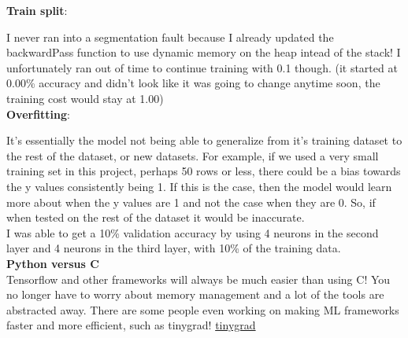 \documentclass{report}
\begin{document}
\textbf{Train split}:

I never ran into a segmentation fault because I already updated the backwardPass function to use dynamic memory on the heap intead of the stack! I unfortunately ran out of time to continue training with 0.1 though. (it started at 0.00\% accuracy and didn't look like it was going to change anytime soon, the training cost would stay at 1.00) \\


\textbf{Overfitting}:

It's essentially the model not being able to generalize from it's training dataset to the rest of the dataset, or new datasets. For example, if we used a very small training set in this project, perhaps 50 rows or less, there could be a bias towards the y values consistently being 1. If this is the case, then the model would learn more about when the y values are 1 and not the case when they are 0. So, if when tested on the rest of the dataset it would be inaccurate. \\
I was able to get a 10\% validation accuracy by using 4 neurons in the second layer and 4 neurons in the third layer, with 10\% of the training data. \\

\textbf{Python versus C} \\

Tensorflow and other frameworks will always be much easier than using C! You no longer have to worry about memory management and a lot of the tools are abstracted away. There are some people even working on making ML frameworks faster and more efficient, such as tinygrad! \href{https://github.com/tinygrad/tinygrad}{tinygrad}
\end{document}

